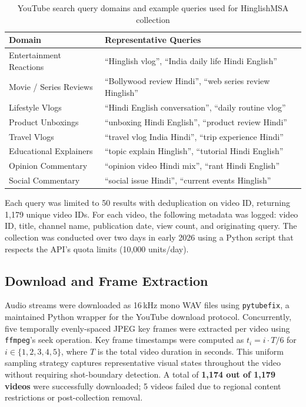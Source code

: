\begin{table}[ht]
\centering
\caption{YouTube search query domains and example queries used for HinglishMSA collection}
\label{tab:queries}
\renewcommand{\arraystretch}{1.3}
\begin{tabular}{p{3.8cm} p{7.5cm}}
\toprule
\textbf{Domain} & \textbf{Representative Queries} \\
\midrule
Entertainment Reactions  & ``Hinglish vlog'', ``India daily life Hindi English'' \\
Movie / Series Reviews   & ``Bollywood review Hindi'', ``web series review Hinglish'' \\
Lifestyle Vlogs          & ``Hindi English conversation'', ``daily routine vlog'' \\
Product Unboxings        & ``unboxing Hindi English'', ``product review Hindi'' \\
Travel Vlogs             & ``travel vlog India Hindi'', ``trip experience Hindi'' \\
Educational Explainers   & ``topic explain Hinglish'', ``tutorial Hindi English'' \\
Opinion Commentary       & ``opinion video Hindi mix'', ``rant Hindi English'' \\
Social Commentary        & ``social issue Hindi'', ``current events Hinglish'' \\
\bottomrule
\end{tabular}
\end{table}

Each query was limited to 50 results with deduplication on video ID, returning 1,179 unique video IDs. For each video, the following metadata was logged: video ID, title, channel name, publication date, view count, and originating query. The collection was conducted over two days in early 2026 using a Python script that respects the API's quota limits (10,000 units/day).

\subsection{Download and Frame Extraction}

Audio streams were downloaded as 16\,kHz mono WAV files using \texttt{pytubefix}, a maintained Python wrapper for the YouTube download protocol. Concurrently, five temporally evenly-spaced JPEG key frames were extracted per video using \texttt{ffmpeg}'s seek operation. Key frame timestamps were computed as $t_i = i \cdot T / 6$ for $i \in \{1, 2, 3, 4, 5\}$, where $T$ is the total video duration in seconds. This uniform sampling strategy captures representative visual states throughout the video without requiring shot-boundary detection. A total of \textbf{1,174 out of 1,179 videos} were successfully downloaded; 5 videos failed due to regional content restrictions or post-collection removal.

